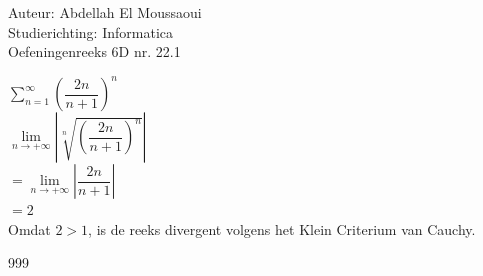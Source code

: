 \documentclass[a4paper]{article}
\begin{document}
  
\noindent \large Auteur: Abdellah El Moussaoui \\
\noindent \large Studierichting: Informatica\\
\noindent \large Oefeningenreeks 6D nr. 22.1\\

\medskip

\normalsize


$\displaystyle\sum_{n=1}^{\infty}\left(\dfrac{2n}{n+1}\right)^n$\\

$ \lim\limits_{n\to+\infty} \left| \sqrt[n]{\left(\dfrac{2n}{n+1}\right)^n} \right| $\\

$ = \lim\limits_{n\to+\infty} \left|\dfrac{2n}{n+1} \right| $\\

$= 2 $\\

Omdat $2 > 1$, is de reeks divergent volgens het Klein Criterium van Cauchy.\\


\begin{thebibliography}{999}
\end{thebibliography}
\end{document}

